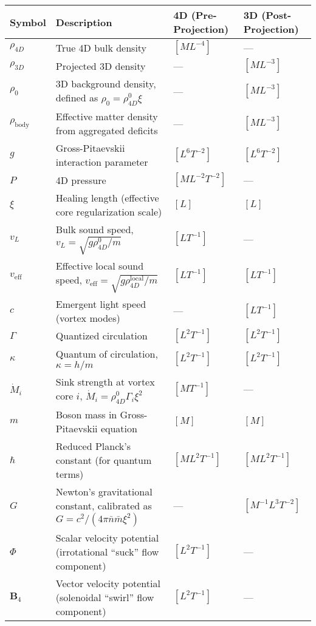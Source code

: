 \begin{table}[H]
\centering
\begin{tabularx}{\textwidth}{|l|Y|l|l|}
\hline
Symbol & Description & 4D (Pre-Projection) & 3D (Post-Projection) \\
\hline
$\rho_{4D}$ & True 4D bulk density & $[M L^{-4}]$ & --- \\
\hline
$\rho_{3D}$ & Projected 3D density & --- & $[M L^{-3}]$ \\
\hline
$\rho_0$ & 3D background density, defined as $\rho_0 = \rho_{4D}^0 \xi$ & --- & $[M L^{-3}]$ \\
\hline
$\rho_{\text{body}}$ & Effective matter density from aggregated deficits & --- & $[M L^{-3}]$ \\
\hline
$g$ & Gross-Pitaevskii interaction parameter & $[L^6 T^{-2}]$ & $[L^6 T^{-2}]$ \\
\hline
$P$ & 4D pressure & $[M L^{-2} T^{-2}]$ & --- \\
\hline
$\xi$ & Healing length (effective core regularization scale) & $[L]$ & $[L]$ \\
\hline
$v_L$ & Bulk sound speed, $v_L = \sqrt{g \rho_{4D}^0 / m}$ & $[L T^{-1}]$ & --- \\
\hline
$v_{\text{eff}}$ & Effective local sound speed, $v_{\text{eff}} = \sqrt{g \rho_{4D}^{\text{local}} / m}$ & $[L T^{-1}]$ & $[L T^{-1}]$ \\
\hline
$c$ & Emergent light speed (vortex modes) & --- & $[L T^{-1}]$ \\
\hline
$\Gamma$ & Quantized circulation & $[L^2 T^{-1}]$ & $[L^2 T^{-1}]$ \\
\hline
$\kappa$ & Quantum of circulation, $\kappa = h / m$ & $[L^2 T^{-1}]$ & $[L^2 T^{-1}]$ \\
\hline
$\dot{M}_i$ & Sink strength at vortex core $i$, $\dot{M}_i = \rho_{4D}^0 \Gamma_i \xi^2$ & $[M T^{-1}]$ & --- \\
\hline
$m$ & Boson mass in Gross-Pitaevskii equation & $[M]$ & $[M]$ \\
\hline
$\hbar$ & Reduced Planck's constant (for quantum terms) & $[M L^2 T^{-1}]$ & $[M L^2 T^{-1}]$ \\
\hline
$G$ & Newton's gravitational constant, calibrated as $G = c^2 / (4\pi \bar{n} \bar{m} \xi^2)$ & --- & $[M^{-1} L^3 T^{-2}]$ \\
\hline
$\Phi$ & Scalar velocity potential (irrotational ``suck'' flow component) & $[L^2 T^{-1}]$ & --- \\
\hline
$\mathbf{B}_4$ & Vector velocity potential (solenoidal ``swirl'' flow component) & $[L^2 T^{-1}]$ & --- \\

\end{tabularx}
\end{table}
